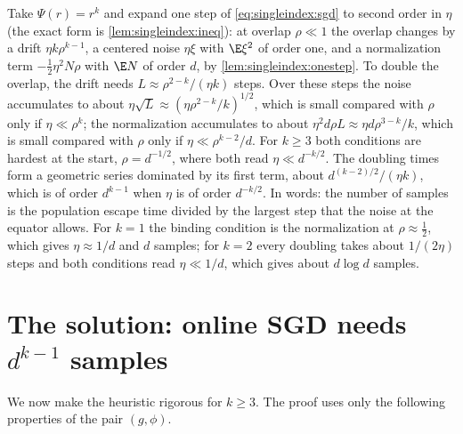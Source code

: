 \begin{refsection}
\begin{heuristic}
Take $\Psi(r)=r^k$ and expand one step of \eqref{eq:singleindex:sgd} to second order in $\eta$ (the exact form is \cref{lem:singleindex:ineq}): at overlap $\rho\ll1$ the overlap changes by a drift $\eta k\rho^{k-1}$, a centered noise $\eta\xi$ with $\E\xi^2$ of order one, and a normalization term $-\frac12\eta^2N\rho$ with $\E N$ of order $d$, by \cref{lem:singleindex:onestep}. To double the overlap, the drift needs $L\approx\rho^{2-k}/(\eta k)$ steps. Over these steps the noise accumulates to about $\eta\sqrt L\approx(\eta\rho^{2-k}/k)^{1/2}$, which is small compared with $\rho$ only if $\eta\ll\rho^k$; the normalization accumulates to about $\eta^2d\rho L\approx\eta d\rho^{3-k}/k$, which is small compared with $\rho$ only if $\eta\ll\rho^{k-2}/d$. For $k\ge3$ both conditions are hardest at the start, $\rho=d^{-1/2}$, where both read $\eta\ll d^{-k/2}$. The doubling times form a geometric series dominated by its first term, about $d^{(k-2)/2}/(\eta k)$, which is of order $d^{k-1}$ when $\eta$ is of order $d^{-k/2}$. In words: the number of samples is the population escape time divided by the largest step that the noise at the equator allows. For $k=1$ the binding condition is the normalization at $\rho\approx\frac12$, which gives $\eta\approx1/d$ and $d$ samples; for $k=2$ every doubling takes about $1/(2\eta)$ steps and both conditions read $\eta\ll1/d$, which gives about $d\log d$ samples.
\end{heuristic}

\section{The solution: online SGD needs \texorpdfstring{$d^{k-1}$}{d\^{}(k-1)} samples}\label{sec:singleindex:sgd}

We now make the heuristic rigorous for $k\ge3$. The proof uses only the following properties of the pair $(g,\phi)$.




\end{refsection}
